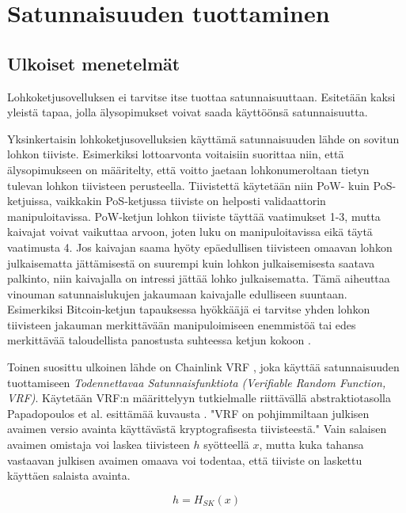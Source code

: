 \chapter{Satunnaisuuden tuottaminen\label{results}}

\section{Ulkoiset menetelmät}

Lohkoketjusovelluksen ei tarvitse itse tuottaa satunnaisuuttaan. Esitetään kaksi yleistä tapaa, jolla älysopimukset voivat saada käyttöönsä satunnaisuutta.

Yksinkertaisin lohkoketjusovelluksien käyttämä satunnaisuuden lähde on sovitun lohkon tiiviste. Esimerkiksi lottoarvonta voitaisiin suorittaa niin, että älysopimukseen on määritelty, että voitto jaetaan lohkonumeroltaan tietyn tulevan lohkon tiivisteen perusteella. Tiivistettä käytetään niin PoW- kuin PoS-ketjuissa, vaikkakin PoS-ketjussa tiiviste on helposti validaattorin manipuloitavissa. PoW-ketjun lohkon tiiviste täyttää vaatimukset 1-3, mutta kaivajat voivat vaikuttaa arvoon, joten luku on manipuloitavissa eikä täytä vaatimusta 4. Jos kaivajan saama hyöty epäedullisen tiivisteen omaavan lohkon julkaisematta jättämisestä on suurempi kuin lohkon julkaisemisesta saatava palkinto, niin kaivajalla on intressi jättää lohko julkaisematta. Tämä aiheuttaa vinouman satunnaislukujen jakaumaan kaivajalle edulliseen suuntaan. Esimerkiksi Bitcoin-ketjun tapauksessa hyökkääjä ei tarvitse yhden lohkon tiivisteen jakauman merkittävään manipuloimiseen enemmistöä tai edes merkittävää taloudellista panostusta suhteessa ketjun kokoon \cite{pierrot_malleability_2018}.

Toinen suosittu ulkoinen lähde on Chainlink VRF \cite{noauthor_chainlink_nodate}, joka käyttää satunnaisuuden tuottamiseen \textit{Todennettavaa Satunnaisfunktiota (Verifiable Random Function, VRF)}. Käytetään VRF:n määrittelyyn tutkielmalle riittävällä abstraktiotasolla Papadopoulos et al. esittämää kuvausta \cite{papadopoulos2017making}. "VRF on pohjimmiltaan julkisen avaimen versio avainta käyttävästä kryptografisesta tiivisteestä." \cite{papadopoulos2017making} Vain salaisen avaimen omistaja voi laskea tiivisteen $h$ syötteellä $x$, mutta kuka tahansa vastaavan julkisen avaimen omaava voi todentaa, että tiiviste on laskettu käyttäen salaista avainta. 

\begin{equation}
    h = H_{SK}(x)
\end{equation}

